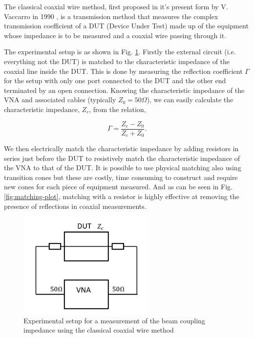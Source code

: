 \documentclass[review, number, sort&compress]{elsarticle}
\begin{document}
The classical coaxial wire method, first proposed in it's present form by V. Vaccarro in 1990 \cite{Vaccaro:ImprovedWireMeth}, is a transmission method that measures the complex transmission coefficient of a DUT (Device Under Test) made up of the equipment whose impedance is to be measured and a coaxial wire passing through it. 

The experimental setup is as shown in Fig. \ref{fig:classic-coax}. Firstly the external circuit (i.e. everything not the DUT) is matched to the characteristic impedance of the coaxial line inside the DUT. This is done by measuring the reflection coefficient $\Gamma$ for the setup with only one port connected to the DUT and the other end terminated by an open connection. Knowing the characteristic impedance of the VNA and associated cables (typically $Z_{0} = 50\Omega$), we can easily calculate the characteristic impedance, $Z_{c}$, from the relation,

\begin{equation}
\Gamma = \frac{Z_{c} - Z_{0}}{Z_{c} + Z_{0}}.
\end{equation}

We then electrically match the characteristic impedance by adding resistors in series just before the DUT to resistively match the characteristic impedance of the VNA to that of the DUT. It is possible to use physical matching also using transition cones but these are costly, time consuming to construct and require new cones for each piece of equipment measured. And as can be seen in Fig. \ref{fig:matching-plot}, matching with a resistor is highly effective at removing the presence of reflections in coaxial measurements.

\begin{figure}
\begin{center}
\includegraphics[width=0.6\textwidth]{figures/wire_meas_single_wire.pdf}
\end{center}
\caption{Experimental setup for a measurement of the beam coupling impedance using the classical coaxial wire method}
\label{fig:classic-coax}
\end{figure} 
\end{document}
